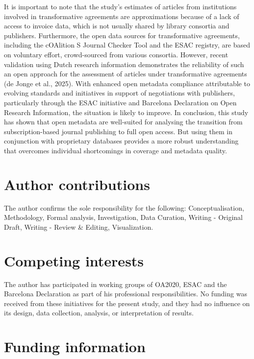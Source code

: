 \documentclass[a4paper,man,floatsintext,longtable,noextraspace,10pt]{apa6}
\begin{document}
It is important to note that the study's estimates of articles from
institutions involved in transformative agreements are approximations
because of a lack of access to invoice data, which is not usually shared
by library consortia and publishers. Furthermore, the open data sources
for transformative agreements, including the cOAlition S Journal Checker
Tool and the ESAC registry, are based on voluntary effort, crowd-sourced
from various consortia. However, recent validation using Dutch research
information demonstrates the reliability of such an open approach for
the assessment of articles under transformative agreements (de Jonge et
al., 2025). With enhanced open metadata compliance attributable to
evolving standards and initiatives in support of negotiations with
publishers, particularly through the ESAC initiative and Barcelona
Declaration on Open Research Information, the situation is likely to
improve. In conclusion, this study has shown that open metadata are
well-suited for analysing the transition from subscription-based journal
publishing to full open access. But using them in conjunction with
proprietary databases provides a more robust understanding that
overcomes individual shortcomings in coverage and metadata quality.

\section*{Author contributions}\label{author-contributions}

The author confirms the sole responsibility for the following:
Conceptualisation, Methodology, Formal analysis, Investigation, Data
Curation, Writing - Original Draft, Writing - Review \& Editing,
Visualization.

\section*{Competing interests}\label{competing-interests}

The author has participated in working groups of OA2020, ESAC and the
Barcelona Declaration as part of his professional responsibilities. No
funding was received from these initiatives for the present study, and
they had no influence on its design, data collection, analysis, or
interpretation of results.

\section*{Funding information}\label{funding-information}
\end{document}
